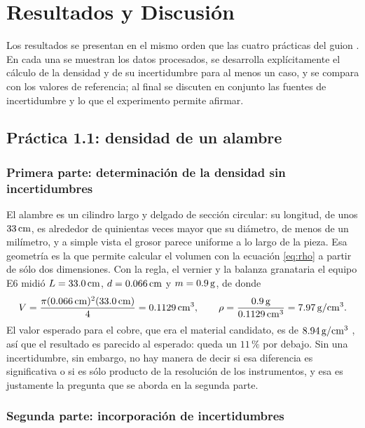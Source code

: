 \section{Resultados y Discusión}

Los resultados se presentan en el mismo orden que las cuatro prácticas del guion \cite{practica}. En cada una se muestran los datos procesados, se desarrolla explícitamente el cálculo de la densidad y de su incertidumbre para al menos un caso, y se compara con los valores de referencia; al final se discuten en conjunto las fuentes de incertidumbre y lo que el experimento permite afirmar.

\subsection{Práctica 1.1: densidad de un alambre}

\subsubsection{Primera parte: determinación de la densidad sin incertidumbres}

El alambre es un cilindro largo y delgado de sección circular: su longitud, de unos $33\,\mathrm{cm}$, es alrededor de quinientas veces mayor que su diámetro, de menos de un milímetro, y a simple vista el grosor parece uniforme a lo largo de la pieza. Esa geometría es la que permite calcular el volumen con la ecuación \eqref{eq:rho} a partir de sólo dos dimensiones. Con la regla, el vernier y la balanza granataria el equipo E6 midió $L = 33.0\,\mathrm{cm}$, $d = 0.066\,\mathrm{cm}$ y $m = 0.9\,\mathrm{g}$, de donde
\begin{equation*}
    V = \frac{\pi (0.066\,\mathrm{cm})^{2} (33.0\,\mathrm{cm})}{4} = 0.1129\,\mathrm{cm^{3}}, \qquad
    \rho = \frac{0.9\,\mathrm{g}}{0.1129\,\mathrm{cm^{3}}} = 7.97\,\mathrm{g/cm^{3}}.
\end{equation*}
El valor esperado para el cobre, que era el material candidato, es de $8.94\,\mathrm{g/cm^{3}}$ \cite{callister}, así que el resultado es parecido al esperado: queda un $11\,\%$ por debajo. Sin una incertidumbre, sin embargo, no hay manera de decir si esa diferencia es significativa o si es sólo producto de la resolución de los instrumentos, y esa es justamente la pregunta que se aborda en la segunda parte.

\subsubsection{Segunda parte: incorporación de incertidumbres}

